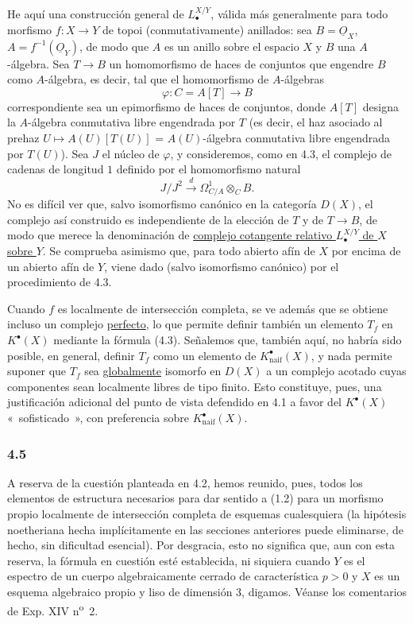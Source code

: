 He aquí una construcción general de $L^{X/Y}_\bullet$, válida más
generalmente para todo morfismo $f:X\to Y$ de topoi (conmutativamente)
anillados: sea $B=\underline O_X$, $A=f^{-1}(\underline O_Y)$, de modo que
$A$ es un anillo sobre el espacio $X$ y $B$ una $A$-álgebra. Sea $T\to B$
un homomorfismo de haces de conjuntos que engendre $B$ como $A$-álgebra, es
decir, tal que el homomorfismo de $A$-álgebras
\[
\varphi:C=A[T]\longrightarrow B
\]
correspondiente sea un epimorfismo de haces de conjuntos, donde $A[T]$
designa la $A$-álgebra conmutativa libre engendrada por $T$ (es decir, el haz
asociado al prehaz $U\longmapsto A(U)[T(U)]$ = $A(U)$-álgebra conmutativa
libre engendrada por $T(U)$).
Sea $J$ el núcleo de $\varphi$, y consideremos, como en 4.3, el complejo de
cadenas de longitud $1$ definido por el homomorfismo natural
\[
J/J^2\xrightarrow{d}\Omega^1_{C/A}\otimes_C B.
\]
No es difícil ver que, salvo isomorfismo canónico en la categoría $D(X)$, el
complejo así construido es independiente de la elección de $T$ y de
$T\to B$, de modo que merece la denominación de \uline{complejo cotangente
relativo $L^{X/Y}_\bullet$ de $X$ sobre $Y$}. Se comprueba asimismo que,
para todo abierto afín de $X$ por encima de un abierto afín de $Y$, viene
dado (salvo isomorfismo canónico) por el procedimiento de 4.3.

Cuando $f$ es localmente de intersección completa, se ve además que se
obtiene incluso un complejo \underline{perfecto}, lo que permite definir
también un elemento $T_f$ en $K^\bullet(X)$ mediante la fórmula (4.3).
Señalemos que, también aquí, no habría sido posible, en general, definir
$T_f$ como un elemento de $K^\bullet_{\mathrm{naif}}(X)$, y nada permite
suponer que $T_f$ sea \underline{globalmente} isomorfo en $D(X)$ a un
complejo acotado cuyas componentes sean localmente libres de tipo finito.
Esto constituye, pues, una justificación adicional del punto de vista
defendido en 4.1 a favor del $K^\bullet(X)$ «~sofisticado~», con preferencia
sobre $K^\bullet_{\mathrm{naif}}(X)$.

\subsubsection*{4.5}
A reserva de la cuestión planteada en 4.2, hemos reunido, pues, todos los
elementos de estructura necesarios para dar sentido a (1.2) para un
morfismo propio localmente de intersección completa de esquemas cualesquiera
(la hipótesis noetheriana hecha implícitamente en las secciones anteriores
puede eliminarse, de hecho, sin dificultad esencial). Por desgracia, esto no
significa que, aun con esta reserva, la fórmula en cuestión esté establecida,
ni siquiera cuando $Y$ es el espectro de un cuerpo algebraicamente cerrado
de característica $p>0$ y $X$ es un esquema algebraico propio y liso de
dimensión $3$, digamos. Véanse los comentarios de Exp. XIV
n\textsuperscript{o}~2.

